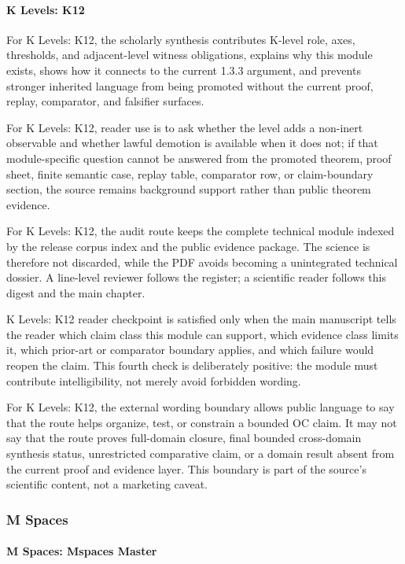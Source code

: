 \paragraph{K Levels: K12}

For K Levels: K12, the scholarly synthesis contributes K-level role, axes, thresholds, and adjacent-level witness obligations, explains why this module exists, shows how it connects to the current 1.3.3 argument, and prevents stronger inherited language from being promoted without the current proof, replay, comparator, and falsifier surfaces.


For K Levels: K12, reader use is to ask whether the level adds a non-inert observable and whether lawful demotion is available when it does not; if that module-specific question cannot be answered from the promoted theorem, proof sheet, finite semantic case, replay table, comparator row, or claim-boundary section, the source remains background support rather than public theorem evidence.


For K Levels: K12, the audit route keeps the complete technical module indexed by the release corpus index and the public evidence package. The science is therefore not discarded, while the PDF avoids becoming a unintegrated technical dossier. A line-level reviewer follows the register; a scientific reader follows this digest and the main chapter.


K Levels: K12 reader checkpoint is satisfied only when the main manuscript tells the reader which claim class this module can support, which evidence class limits it, which prior-art or comparator boundary applies, and which failure would reopen the claim. This fourth check is deliberately positive: the module must contribute intelligibility, not merely avoid forbidden wording.


For K Levels: K12, the external wording boundary allows public language to say that the route helps organize, test, or constrain a bounded OC claim. It may not say that the route proves full-domain closure, final bounded cross-domain synthesis status, unrestricted comparative claim, or a domain result absent from the current proof and evidence layer. This boundary is part of the source's scientific content, not a marketing caveat.


\subsubsection{M Spaces}

\paragraph{M Spaces: Mspaces Master}

